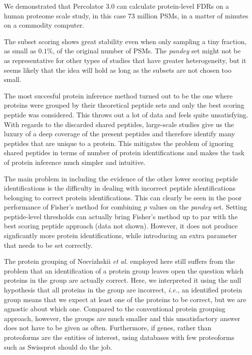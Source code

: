 \documentclass{article}
\begin{document}
We demonstrated that Percolator 3.0 can calculate protein-level FDRs
on a human proteome scale study, in this case $73$ million PSMs, in a
matter of minutes on a commodity computer.

The subset scoring shows great stability even when only sampling a
tiny fraction, as small as $0.1\%$, of the original number of PSMs.
The {\em pandey} set might not be as representative for other types of
studies that have greater heterogeneity, but it seems likely that the
idea will hold as long as the subsets are not chosen too small.

The most succesful protein inference method turned out to be the one
where proteins were grouped by their theoretical peptide sets and only
the best scoring peptide was considered. This throws out a lot of data
and feels quite unsatisfying. With regards to the discarded shared
peptides, large-scale studies give us the luxury of a deep coverage of
the present peptides and therefore identify many peptides that
are unique to a protein. This mitigates the problem of ignoring shared
peptides in terms of number of protein identifications and makes the
task of protein inference much simpler and intuitive.

The main problem in including the evidence of the other lower scoring
peptide identifications is the difficulty in dealing with incorrect
peptide identifications belonging to correct protein identifications.
This can clearly be seen in the poor performance of Fisher's method
for combining $p$ values on the {\em pandey} set. Setting
peptide-level thresholds can actually bring Fisher's method up to par
with the best scoring peptide approach (data not shown). However,
it does not produce signficantly more protein identifications,
while introducing an extra parameter that needs to be set correctly.

The protein grouping of Nesvizhskii {\em et al.} employed here still
suffers from the problem that an identification of a protein group
leaves open the question which proteins in the group are actually
correct. Here, we interpreted it using the null hypothesis that all
proteins in the group are incorrect, {\em i.e.}, an identified protein
group means that we expect at least one of the proteins to be correct,
but we are agnostic about which one. Compared to the conventional
protein grouping approach, however, the groups are much smaller and
this unsatisfactory answer does not have to be given as often.
Furthermore, if genes, rather than proteoforms are the entities of
interest, using databases with few proteoforms such as Swissprot
should do the job.
\end{document}
